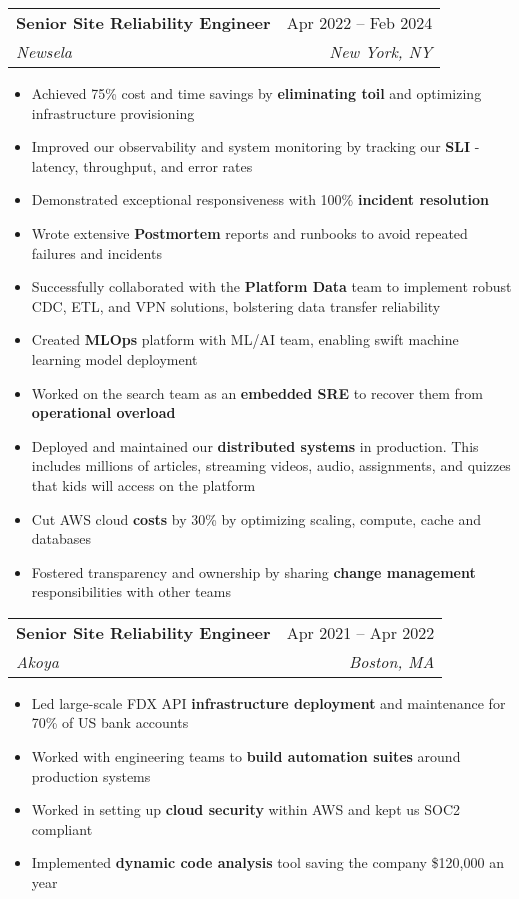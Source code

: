 \documentclass[letterpaper,11pt]{article}
\makeatletter
\newcommand{\resumeItem}[1]{
  \item\small{
    {#1 \vspace{-2pt}}
  }
}
\newcommand{\resumeSubheading}[4]{
  \vspace{-2pt}\item
    \begin{tabular*}{0.97\textwidth}[t]{l@{\extracolsep{\fill}}r}
      \textbf{#1} & #2 \\
      \textit{\small#3} & \textit{\small #4} \\
    \end{tabular*}\vspace{-7pt}
}
\newcommand{\resumeSubSubheading}[2]{
    \item
    \begin{tabular*}{0.97\textwidth}{l@{\extracolsep{\fill}}r}
      \textit{\small#1} & \textit{\small #2} \\
    \end{tabular*}\vspace{-7pt}
}
\newcommand{\resumeSubHeadingListEnd}{\end{itemize}}
\newcommand{\resumeItemListStart}{\begin{itemize}}
\newcommand{\resumeItemListEnd}{\end{itemize}\vspace{-5pt}}
\makeatother
\begin{document}
    \resumeSubheading
      {Senior Site Reliability Engineer}{Apr 2022 -- Feb 2024}
      {Newsela}{New York, NY}
      \resumeItemListStart
        \resumeItem{Achieved 75\% cost and time savings by \textbf{eliminating toil} and optimizing infrastructure provisioning}
        \resumeItem{Improved our observability and system monitoring by tracking our \textbf{SLI} - latency, throughput, and error rates}
        \resumeItem{Demonstrated exceptional responsiveness with 100\% \textbf{incident resolution}}
        \resumeItem{Wrote extensive \textbf{Postmortem} reports and runbooks to avoid repeated failures and incidents}
        \resumeItem{Successfully collaborated with the \textbf{Platform Data} team to implement robust CDC, ETL, and VPN solutions, bolstering data transfer reliability}
        \resumeItem{Created \textbf{MLOps} platform with ML/AI team, enabling swift machine learning model deployment}
        \resumeItem{Worked on the search team as an \textbf{embedded SRE} to recover them from \textbf{operational overload}}
        \resumeItem{Deployed and maintained our \textbf{distributed systems} in production. This includes millions of articles, streaming videos, audio, assignments, and quizzes that kids will access on the platform}
        \resumeItem{Cut AWS cloud \textbf{costs} by 30\% by optimizing scaling, compute, cache and databases }
        \resumeItem{Fostered transparency and ownership by sharing \textbf{change management} responsibilities with other teams}
      \resumeItemListEnd
      

    \resumeSubheading
      {Senior Site Reliability Engineer}{Apr 2021 -- Apr 2022}
      {Akoya}{Boston, MA}
      \resumeItemListStart
        \resumeItem{Led large-scale FDX API \textbf{infrastructure deployment} and maintenance for 70\% of US bank accounts}
        \resumeItem{Worked with engineering teams to \textbf{build automation suites} around production systems}
        \resumeItem{Worked in setting up \textbf{cloud security} within AWS and kept us SOC2 compliant}
        \resumeItem{Implemented\textbf{ dynamic code analysis} tool saving the company \$120,000 an year }
    \resumeItemListEnd
\end{document}
